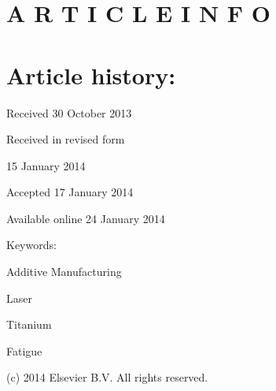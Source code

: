 \documentclass[10pt]{article}
\begin{document}
\section*{A R T I C L E I N F O}
\section*{Article history:}
Received 30 October 2013

Received in revised form

15 January 2014

Accepted 17 January 2014

Available online 24 January 2014

Keywords:

Additive Manufacturing

Laser

Titanium

Fatigue

\begin{abstract}
A B S T R A C T Additive Manufacturing of titanium components holds promise to deliver benefits such as reduced cost, weight and carbon emissions during both manufacture and use. To capitalize on these benefits, it must be shown that the mechanical performance of parts produced by Additive Manufacturing can meet design requirements that are typically based on wrought material performance properties. Of particular concern for safety critical structures are the fatigue properties of parts produced by Additive Manufacturing. This research evaluates the fatigue properties of Ti-6Al-4V specimens produced by the Selective Laser Melting additive manufacturing process. It was found that the fatigue life is significantly lower compared to wrought material. This reduction in fatigue performance was attributed to a variety of issues, such as microstructure, porosity, surface finish and residual stress. There was also found to be a high degree of anisotropy in the fatigue performance associated with the specimen build orientation.
\end{abstract}

(c) 2014 Elsevier B.V. All rights reserved.
\end{document}
